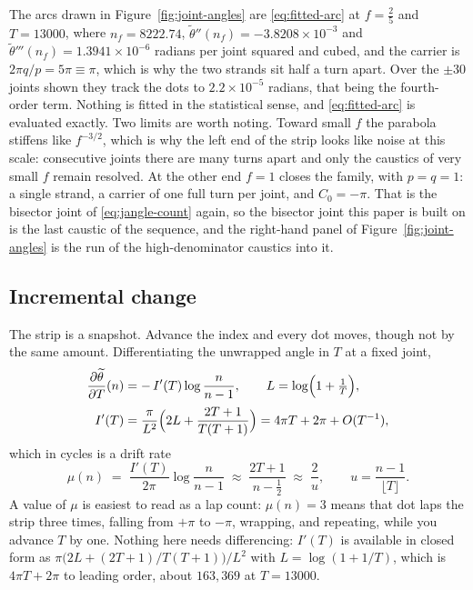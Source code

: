 \documentclass[11pt]{article}
\theoremstyle{definition}
\begin{document}
The arcs drawn in Figure~\ref{fig:joint-angles} are \eqref{eq:fitted-arc} at
$f=\tfrac25$ and $T=13000$, where $n_f=8222.74$,
$\widetilde\theta''(n_f)=-3.8208\times10^{-3}$ and
$\widetilde\theta'''(n_f)=1.3941\times10^{-6}$ radians per joint squared and
cubed, and the carrier is $2\pi q/p=5\pi\equiv\pi$, which is why the two strands
sit half a turn apart. Over the $\pm30$ joints shown they track the dots to
$2.2\times10^{-5}$ radians, that being the fourth-order term. Nothing is fitted
in the statistical sense, and \eqref{eq:fitted-arc} is evaluated exactly.
Two limits are worth noting.
Toward small $f$ the parabola stiffens like $f^{-3/2}$, which is why the
left end of the strip looks like noise at this scale: consecutive joints there
are many turns apart and only the caustics of very small $f$ remain resolved. At
the other end $f=1$ closes the family, with $p=q=1$: a single strand, a carrier of
one full turn per joint, and $C_0=-\pi$. That is the bisector joint of
\eqref{eq:jangle-count} again, so the bisector joint this paper is built on is the last
caustic of the sequence, and the right-hand panel of
Figure~\ref{fig:joint-angles} is the run of the high-denominator caustics into
it.

\subsection{Incremental change}\label{sec:incremental}

The strip is a snapshot. Advance the index and every dot moves, though not by
the same amount. Differentiating the unwrapped angle in $T$ at a fixed joint,
\begin{equation}\label{eq:jangle-drift}
\begin{aligned}
\frac{\partial\widetilde\theta}{\partial T}(n)&=-\,I'(T)\log\frac{n}{n-1},
\qquad L=\log\Bigl(1+\tfrac1T\Bigr),\\[2pt]
I'(T)&=\frac{\pi}{L^{2}}\Bigl(2L+\frac{2T+1}{T(T+1)}\Bigr)
=4\pi T+2\pi+O(T^{-1}),
\end{aligned}
\end{equation}
which in cycles is a drift rate
\begin{equation}\label{eq:jangle-drift-cycles}
\mu(n)\;=\;\frac{I'(T)}{2\pi}\log\frac{n}{n-1}
\;\approx\;\frac{2T+1}{n-\tfrac12}\;\approx\;\frac{2}{u},
\qquad u=\frac{n-1}{\lfloor T\rfloor}.
\end{equation}
A value of $\mu$ is easiest to read as a lap count: $\mu(n)=3$ means that dot
laps the strip three times, falling from $+\pi$ to $-\pi$, wrapping, and
repeating, while you advance $T$ by one. Nothing here needs differencing:
$I'(T)$ is available in closed form as
$\pi\bigl(2L+(2T+1)/T(T+1)\bigr)/L^{2}$ with $L=\log(1+1/T)$, which is
$4\pi T+2\pi$ to leading order, about $163{,}369$ at $T=13000$.
\end{document}
